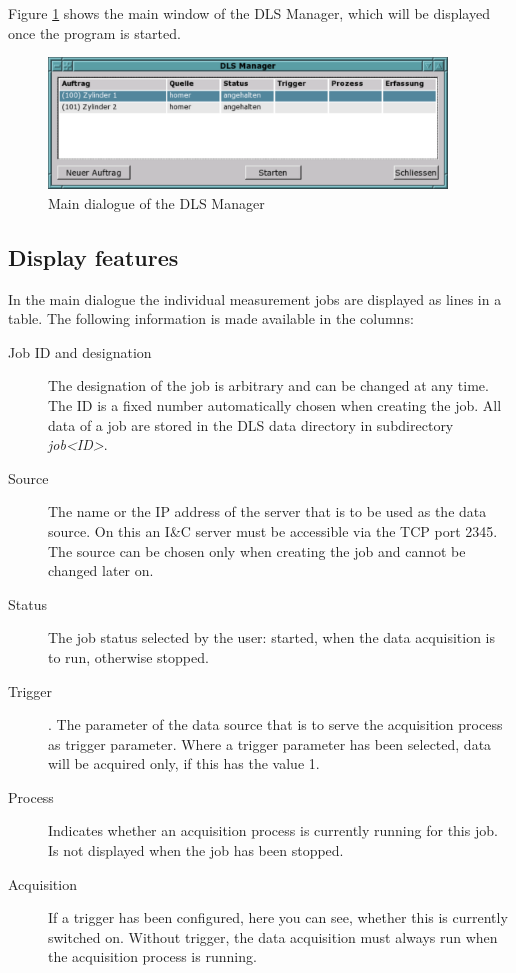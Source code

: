 \documentclass[a4paper,12pt,BCOR6mm,bibtotoc,idxtotoc]{scrbook}
\begin{document}
Figure \ref{fig:dls_ctl_main} shows the main window of the DLS Manager, which will be displayed once the program is started.

\begin{figure}[tbh] \begin{center} \includegraphics[width=300pt]{bilder/ctl_main} \end{center} \caption{Main dialogue of the DLS Manager} \label{fig:dls_ctl_main} \end{figure}


\subsection{Display features}

In the main dialogue the individual measurement jobs are displayed as lines in a table. The following information is made available in the columns:

\begin{description} 
\item[Job ID and designation] The designation of the job is arbitrary and can be changed at any time. The ID is a fixed number automatically chosen when creating the job. All data of a job are stored in the DLS data directory in subdirectory \textit{job\textless ID\textgreater}. 
\item[Source] The name or the IP address of the server that is to be
  used as the data source. On this an I\&C server must be accessible
  via the TCP port 2345. The source can be chosen only when creating
  the job and cannot be changed later on.
\item[Status] The job status selected by the user: \glqq started\grqq, when the data acquisition is to run, otherwise \glqq stopped\grqq. 
\item[Trigger]. The parameter of the data source that is to serve the acquisition process as trigger parameter. Where a trigger parameter has been selected, data will be acquired only, if this has the value 1. 
\item[Process] Indicates whether an acquisition process is currently running for this job. Is not displayed when the job has been stopped. 
\item[Acquisition] If a trigger has been configured, here you can see, whether this is currently switched on. Without trigger, the data acquisition must always run when the acquisition process is running. \end{description}
\end{document}
